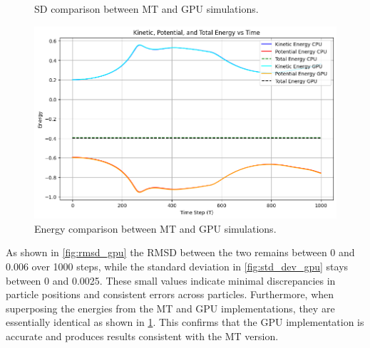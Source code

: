 \documentclass[english,11pt]{article}
\begin{document}
\begin{figure}[h!]
\begin{minipage}{0.3\textwidth}
        \caption{SD comparison between MT and GPU simulations.}
        \label{fig:std_dev_gpu}
    \end{minipage}
    \begin{minipage}{0.3\textwidth}
        \centering
        \includegraphics[width=\textwidth]{graph/E_GPUCPU.png}
        \caption{Energy comparison between MT and GPU simulations.}
        \label{fig:E_gpu}
    \end{minipage}
\end{figure}

As shown in \ref{fig:rmsd_gpu} the RMSD between the two remains between 0 and 0.006 over 1000 steps, while the standard deviation in \ref{fig:std_dev_gpu} stays between 0 and 0.0025. These small values indicate minimal discrepancies in particle positions and consistent errors across particles. Furthermore, when superposing the energies from the MT and GPU implementations, they are essentially identical as shown in \ref{fig:E_gpu}. This confirms that the GPU implementation is accurate and produces results consistent with the MT version.
\end{document}
